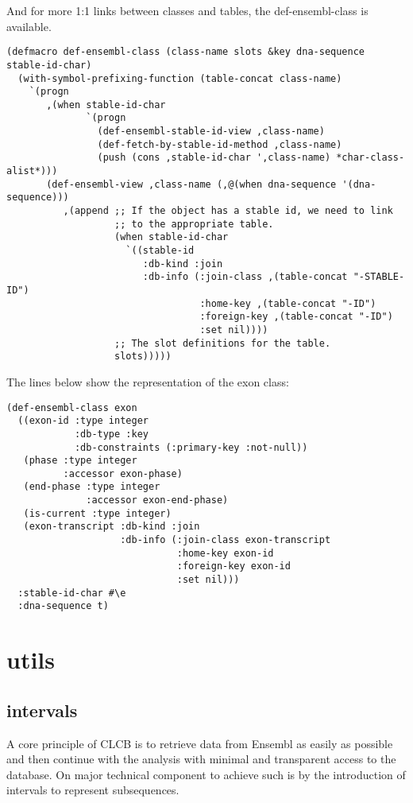 \documentclass{book}
\newcommand\CLCB{CLCB }
\begin{document}
And for more 1:1 links between classes and tables, the def-ensembl-class is available.

\begin{lstlisting}
(defmacro def-ensembl-class (class-name slots &key dna-sequence stable-id-char)
  (with-symbol-prefixing-function (table-concat class-name)
    `(progn
       ,(when stable-id-char
              `(progn
                (def-ensembl-stable-id-view ,class-name)
                (def-fetch-by-stable-id-method ,class-name)
                (push (cons ,stable-id-char ',class-name) *char-class-alist*)))
       (def-ensembl-view ,class-name (,@(when dna-sequence '(dna-sequence)))
          ,(append ;; If the object has a stable id, we need to link
                   ;; to the appropriate table.
                   (when stable-id-char
                     `((stable-id
                        :db-kind :join
                        :db-info (:join-class ,(table-concat "-STABLE-ID")
                                  :home-key ,(table-concat "-ID")
                                  :foreign-key ,(table-concat "-ID")
                                  :set nil))))
                   ;; The slot definitions for the table.
                   slots)))))
\end{lstlisting}

The lines below show the representation of the exon class:
\begin{lstlisting}
(def-ensembl-class exon
  ((exon-id :type integer
            :db-type :key
            :db-constraints (:primary-key :not-null))
   (phase :type integer
          :accessor exon-phase)
   (end-phase :type integer
              :accessor exon-end-phase)
   (is-current :type integer)
   (exon-transcript :db-kind :join
                    :db-info (:join-class exon-transcript
                              :home-key exon-id
                              :foreign-key exon-id
                              :set nil)))
  :stable-id-char #\e
  :dna-sequence t)
\end{lstlisting}

\section{utils}
\subsection{intervals}

A core principle of \CLCB is to retrieve data from Ensembl as easily as
possible and then continue with the analysis with minimal and transparent
access to the database. On major technical component to achieve such is
by the introduction of intervals to represent subsequences.
\end{document}
